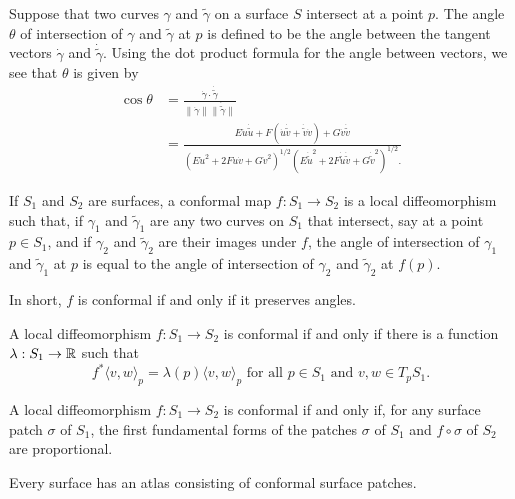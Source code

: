 Suppose that two curves $\gamma$ and $\tilde \gamma$ on a surface $S$
intersect at a point $p$.
The angle $\theta$ of intersection of $\gamma$ and $\tilde \gamma$
at $p$ is defined to be the angle between the tangent vectors
$\dot{\gamma}$ and $\dot{\tilde \gamma}$. Using the dot product
formula for the angle between vectors, we see that $\theta$ is given by
\begin{align*}
  \cos \theta &= \frac{
    \dot{\gamma} \cdot \dot{\tilde \gamma}
  }{
    \|\dot{\gamma}\| \|\dot{\tilde \gamma}\|
  }\\
  &= \frac{
    E \dot{u} \dot{\tilde u} +
    F(\dot{u}\dot{\tilde v} +
    \dot{\tilde v}\dot{v}) + G \dot{v} \dot{\tilde v}
  }{
    (
      E \dot{u}^2 +
      2 F \dot{u}\dot{v} +
      G \dot{v}^2
    )^{1/2}
    (
      E \dot{\tilde u}^2 +
      2 F \dot{\tilde u}\dot{\tilde v} +
      G \dot{\tilde v}^2
    )^{1/2}.
  }
\end{align*}

\begin{defn}
  If $S_1$ and $S_2$ are surfaces, a conformal map $f: S_1 \to S_2$ is a
  local diffeomorphism such that, if $\gamma_1$ and $\tilde \gamma_1$
  are any two curves on $S_1$ that intersect, say at a point $p \in S_1$,
  and if $\gamma_2$ and $\tilde \gamma_2$ are their images under $f$,
  the angle of intersection of $\gamma_1$ and $\tilde \gamma_1$ at $p$
  is equal to the angle of intersection of $\gamma_2$ and $\tilde \gamma_2$
  at $f(p)$.
\end{defn}

In short, $f$ is conformal if and only if it preserves angles.

\begin{theorem}
  A local diffeomorphism $f: S_1 \to S_2$ is conformal if and only if
  there is a function $\lambda: S_1 \to \mathbb{R}$ such that
  \[
    f^*\langle v, w \rangle_p  = \lambda(p) \langle v, w \rangle_p \text{ for all }
    p \in S_1 \text{ and } v, w \in T_p S_1.
  \]
\end{theorem}

\begin{corollary}
  A local diffeomorphism $f: S_1 \to S_2$ is conformal if and only if, for
  any surface patch $\sigma$ of $S_1$, the first fundamental forms of the
  patches $\sigma$ of $S_1$ and $f \circ \sigma$ of $S_2$ are proportional.
\end{corollary}

\begin{theorem}
  Every surface has an atlas consisting of conformal surface patches.
\end{theorem}
